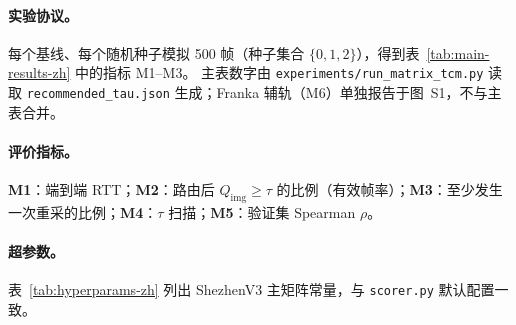 \paragraph{实验协议。}
每个基线、每个随机种子模拟 500 帧（种子集合 $\{0,1,2\}$），得到表~\ref{tab:main-results-zh} 中的指标 M1--M3。
主表数字由 \texttt{experiments/run\_matrix\_tcm.py} 读取 \texttt{recommended\_tau.json} 生成；Franka 辅轨（M6）单独报告于图~S1，不与主表合并。

\paragraph{评价指标。}
\textbf{M1}：端到端 RTT；\textbf{M2}：路由后 $Q_{\mathrm{img}}\geq\tau$ 的比例（有效帧率）；\textbf{M3}：至少发生一次重采的比例；\textbf{M4}：$\tau$ 扫描；\textbf{M5}：验证集 Spearman $\rho$。

\paragraph{超参数。}
表~\ref{tab:hyperparams-zh} 列出 ShezhenV3 主矩阵常量，与 \texttt{scorer.py} 默认配置一致。

\begin{table}[t]
\centering
\caption{关键超参数（Paper~I，ShezhenV3 主矩阵）。}
\label{tab:hyperparams-zh}
\small
{}
\end{table}
